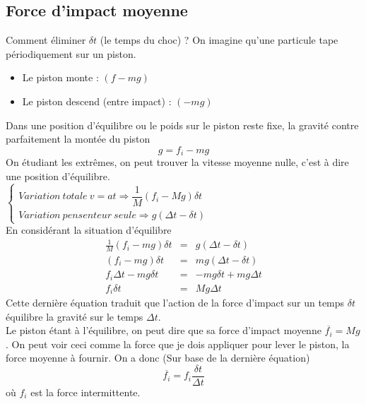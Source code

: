 \documentclass	[11pt, a4paper, openany]{book}
\begin{document}
\subsection{Force d'impact moyenne}
Comment éliminer $\delta t$ (le temps du choc) ? On imagine qu'une particule tape périodiquement sur un piston.
\begin{itemize}
	\item Le piston monte : $(f - mg)$
	\item Le piston descend (entre impact) : $(-mg)$
\end{itemize}
Dans une position d'équilibre ou le poids sur le piston reste fixe, la gravité contre parfaitement la montée du piston 
\begin{equation}
	g = f_i - mg
\end{equation}
On étudiant les extrêmes, on peut trouver la vitesse moyenne nulle, c'est à dire une position d'équilibre.\\
$\left\{\begin{array}{l}
Variation\ totale\ v = at  \Rightarrow \dfrac{1}{M}\left(f_i - Mg\right)\delta t\\
Variation\ pensenteur\ seule  \Rightarrow g(\Delta t -  \delta t)
\end{array}\right.$\\
En considérant la situation d'équilibre
\begin{eqnarray}
	\frac{1}{M}(f_i - mg)\delta t &=& g(\Delta t - \delta t)\\
	(f_i - mg)\delta t &=& mg(\Delta t - \delta t)\\
	f_i\Delta t - mg\delta t &=& - mg\delta t + mg \Delta t\\
	f_i \delta t &=& Mg\Delta t
\end{eqnarray}
Cette dernière équation traduit que l'action de la force d'impact sur un temps $\delta t$ équilibre la gravité sur le temps $\Delta t$.\\

Le piston étant à l'équilibre, on peut dire que sa force d'impact moyenne $\overline{f_i} = Mg$. On peut voir ceci comme la force que je dois appliquer pour lever le piston, la force moyenne à fournir.  On a donc (Sur base de la dernière équation)
\begin{equation}
	\overline{f_i} = f_i \frac{\delta t}{\Delta t}
\end{equation}
où $f_i$ est la force intermittente.
\end{document}
